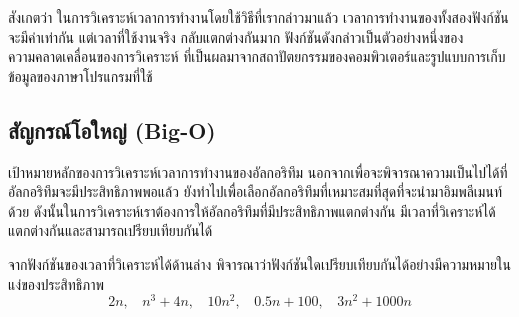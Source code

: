 สังเกต{\wbr}ว่า ใน{\wbr}การ{\wbr}วิเคราะห์{\wbr}เวลา{\wbr}การ{\wbr}ทำงาน{\wbr}โดย{\wbr}ใช้{\wbr}วิธี{\wbr}ที่{\wbr}เรา{\wbr}กล่าว{\wbr}มา{\wbr}แล้ว{\wbr}
เวลา{\wbr}การ{\wbr}ทำงาน{\wbr}ของ{\wbr}ทั้ง{\wbr}สอง{\wbr}ฟังก์ชัน{\wbr}จะ{\wbr}มี{\wbr}ค่า{\wbr}เท่า{\wbr}กัน แต่{\wbr}เวลา{\wbr}ที่{\wbr}ใช้{\wbr}งาน{\wbr}จริง กลับ{\wbr}แตกต่าง{\wbr}กัน{\wbr}มาก{\wbr}
ฟังก์ชัน{\wbr}ดังกล่าว{\wbr}เป็น{\wbr}ตัวอย่าง{\wbr}หนึ่ง{\wbr}ของ{\wbr}ความ{\wbr}คลาดเคลื่อน{\wbr}ของ{\wbr}การ{\wbr}วิเคราะห์{\wbr}
ที่{\wbr}เป็น{\wbr}ผล{\wbr}มา{\wbr}จาก{\wbr}สถาปัตยกรรม{\wbr}ของ{\wbr}คอมพิวเตอร์{\wbr}และ{\wbr}รูปแบบ{\wbr}การ{\wbr}เก็บ{\wbr}ข้อมูล{\wbr}ของ{\wbr}ภาษา{\wbr}โปรแกรม{\wbr}ที่{\wbr}ใช้{\wbr}

\subsection{สัญกรณ์โอ{\wbr}ใหญ่ (Big-O)}
\label{sect:analysis-big-o-definition}

เป้าหมาย{\wbr}หลัก{\wbr}ของ{\wbr}การ{\wbr}วิเคราะห์{\wbr}เวลา{\wbr}การ{\wbr}ทำงาน{\wbr}ของ{\wbr}อัล{\wbr}กอ{\wbr}ริ{\wbr}ทึม{\wbr}
นอกจาก{\wbr}เพื่อ{\wbr}จะ{\wbr}พิจารณา{\wbr}ความ{\wbr}เป็น{\wbr}ไป{\wbr}ได้{\wbr}ที่{\wbr}อัล{\wbr}กอ{\wbr}ริ{\wbr}ทึม{\wbr}จะ{\wbr}มี{\wbr}ประสิทธิภาพ{\wbr}พอ{\wbr}แล้ว{\wbr}
ยัง{\wbr}ทำ{\wbr}ไป{\wbr}เพื่อ{\wbr}เลือก{\wbr}อัล{\wbr}กอ{\wbr}ริ{\wbr}ทึม{\wbr}ที่{\wbr}เหมาะสม{\wbr}ที่สุด{\wbr}ที่{\wbr}จะ{\wbr}นำมา{\wbr}อิม{\wbr}พลี{\wbr}เมนท์{\wbr}ด้วย{\wbr}
ดังนั้น{\wbr}ใน{\wbr}การ{\wbr}วิเคราะห์{\wbr}เรา{\wbr}ต้องการ{\wbr}ให้{\wbr}อัล{\wbr}กอ{\wbr}ริ{\wbr}ทึม{\wbr}ที่{\wbr}มี{\wbr}ประสิทธิภาพ{\wbr}แตกต่าง{\wbr}กัน{\wbr}
มี{\wbr}เวลา{\wbr}ที่{\wbr}วิเคราะห์{\wbr}ได้{\wbr}แตกต่าง{\wbr}กัน{\wbr}และ{\wbr}สามารถ{\wbr}เปรียบเทียบ{\wbr}กัน{\wbr}ได้{\wbr}

\begin{quiz}{}
จาก{\wbr}ฟังก์ชัน{\wbr}ของ{\wbr}เวลา{\wbr}ที่{\wbr}วิเคราะห์{\wbr}ได้{\wbr}ด้าน{\wbr}ล่าง{\wbr}
พิจารณา{\wbr}ว่า{\wbr}ฟังก์ชัน{\wbr}ใด{\wbr}เปรียบเทียบ{\wbr}กัน{\wbr}ได้{\wbr}อย่าง{\wbr}มี{\wbr}ความหมาย{\wbr}ใน{\wbr}แง่{\wbr}ของ{\wbr}ประสิทธิภาพ{\wbr}
\[
2n, \ \ \ \ n^3 + 4n, \ \ \ \ 10n^2, \ \ \ \ 0.5n + 100, \ \ \ \ 3n^2 + 1000n
\]
\end{quiz}

